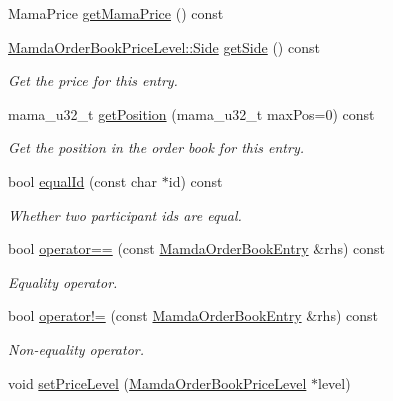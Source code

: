 \begin{CompactItemize}
Mama\-Price \hyperlink{classWombat_1_1MamdaOrderBookEntry_c80d40d8f66442d7c61ec41c6da43400}{get\-Mama\-Price} () const 
\item 
\hyperlink{classWombat_1_1MamdaOrderBookPriceLevel_384c34b0a74d874b8969dee9b0d3718d}{Mamda\-Order\-Book\-Price\-Level::Side} \hyperlink{classWombat_1_1MamdaOrderBookEntry_927b3698111419c12f246c8772e7524c}{get\-Side} () const 
\begin{CompactList}\small\item\em Get the price for this entry. \item\end{CompactList}\item 
mama\_\-u32\_\-t \hyperlink{classWombat_1_1MamdaOrderBookEntry_8fa9b93116640f02e93e3fa4eea3dee2}{get\-Position} (mama\_\-u32\_\-t max\-Pos=0) const 
\begin{CompactList}\small\item\em Get the position in the order book for this entry. \item\end{CompactList}\item 
bool \hyperlink{classWombat_1_1MamdaOrderBookEntry_ed761cda818725c86f8230388c5711b0}{equal\-Id} (const char $\ast$id) const 
\begin{CompactList}\small\item\em Whether two participant ids are equal. \item\end{CompactList}\item 
bool \hyperlink{classWombat_1_1MamdaOrderBookEntry_321cbae34ac538e2afe23be61c7c9d63}{operator==} (const \hyperlink{classWombat_1_1MamdaOrderBookEntry}{Mamda\-Order\-Book\-Entry} \&rhs) const 
\begin{CompactList}\small\item\em Equality operator. \item\end{CompactList}\item 
bool \hyperlink{classWombat_1_1MamdaOrderBookEntry_d39539dde14628be1035513ed5c57b03}{operator!=} (const \hyperlink{classWombat_1_1MamdaOrderBookEntry}{Mamda\-Order\-Book\-Entry} \&rhs) const 
\begin{CompactList}\small\item\em Non-equality operator. \item\end{CompactList}\item 
void \hyperlink{classWombat_1_1MamdaOrderBookEntry_8e9225992aec78b2bd455d0d14c8d257}{set\-Price\-Level} (\hyperlink{classWombat_1_1MamdaOrderBookPriceLevel}{Mamda\-Order\-Book\-Price\-Level} $\ast$level)

\end{CompactItemize}
